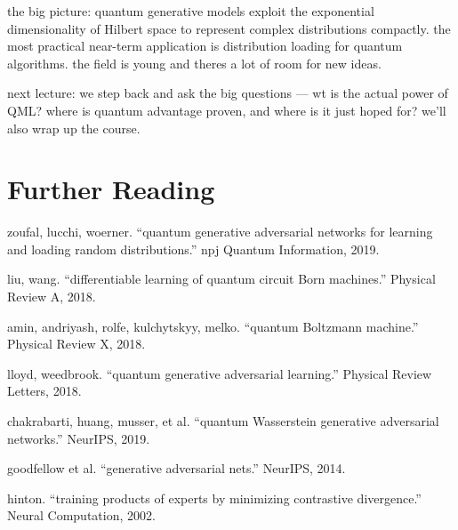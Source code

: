 \documentclass[11pt,a4paper]{article}
\theoremstyle{definition}
\theoremstyle{remark}
\begin{document}
the big picture: quantum generative models exploit the exponential dimensionality of Hilbert space to represent complex distributions compactly. the most practical near-term application is distribution loading for quantum algorithms. the field is young and theres a lot of room for new ideas.

next lecture: we step back and ask the big questions --- wt is the actual power of QML? where is quantum advantage proven, and where is it just hoped for? we'll also wrap up the course.

\section{Further Reading}

\begin{enumerate}[label={[\arabic*]}]
    \item zoufal, lucchi, woerner. ``quantum generative adversarial networks for learning and loading random distributions.'' npj Quantum Information, 2019.
    \item liu, wang. ``differentiable learning of quantum circuit Born machines.'' Physical Review A, 2018.
    \item amin, andriyash, rolfe, kulchytskyy, melko. ``quantum Boltzmann machine.'' Physical Review X, 2018.
    \item lloyd, weedbrook. ``quantum generative adversarial learning.'' Physical Review Letters, 2018.
    \item chakrabarti, huang, musser, et al. ``quantum Wasserstein generative adversarial networks.'' NeurIPS, 2019.
    \item goodfellow et al. ``generative adversarial nets.'' NeurIPS, 2014.
    \item hinton. ``training products of experts by minimizing contrastive divergence.'' Neural Computation, 2002.
\end{enumerate}
\end{document}
